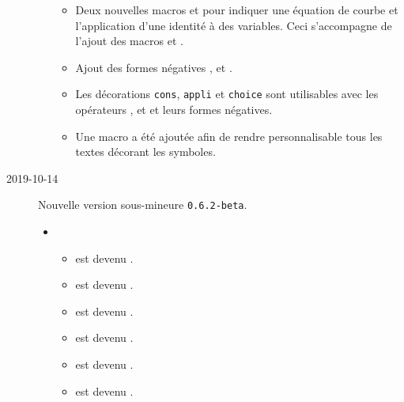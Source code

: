 \documentclass[12pt,a4paper]{article}
\begin{document}
\begin{description}
\begin{itemize}[itemsep=.5em]
\begin{itemize}[itemsep=.5em]
            \item Deux nouvelles macros  et  pour indiquer une équation de courbe et l'application d'une identité à des variables. Ceci s'accompagne de l'ajout des macros  et .
    
            \item Ajout des formes négatives ,  et .
    
            \item Les décorations \verb+cons+, \verb+appli+ et \verb+choice+ sont utilisables avec les opérateurs ,  et  et leurs formes négatives.
    
            \item Une macro  a été ajoutée afin de rendre personnalisable tous les textes décorant les symboles.
        \end{itemize}
    \end{itemize}


    \medskip
    \item[2019-10-14] Nouvelle version sous-mineure \verb+0.6.2-beta+.
    
    \begin{itemize}[itemsep=.5em]
        \item {}
        \begin{itemize}[itemsep=.5em]
            \item {} est devenu .
    
            \item {} est devenu .
    
            \item {} est devenu .
    
            \item {} est devenu .
    
            \item {} est devenu .
    
            \item {} est devenu .
        \end{itemize}
    \end{itemize}


\end{description}
\end{document}
